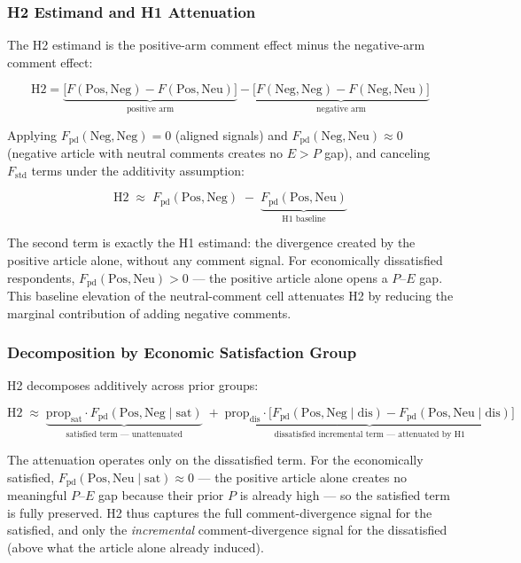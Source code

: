 \documentclass[
  12pt]{article}
\begin{document}
\subsubsection{H2 Estimand and H1
Attenuation}\label{h2-estimand-and-h1-attenuation}

The H2 estimand is the positive-arm comment effect minus the
negative-arm comment effect:

\[\text{H2} = \underbrace{\bigl[F(\text{Pos},\text{Neg}) - F(\text{Pos},\text{Neu})\bigr]}_{\text{positive arm}} - \underbrace{\bigl[F(\text{Neg},\text{Neg}) - F(\text{Neg},\text{Neu})\bigr]}_{\text{negative arm}}\]

Applying \(F_\text{pd}(\text{Neg},\text{Neg}) = 0\) (aligned signals)
and \(F_\text{pd}(\text{Neg},\text{Neu}) \approx 0\) (negative article
with neutral comments creates no \(E > P\) gap), and canceling
\(F_\text{std}\) terms under the additivity assumption:

\[\text{H2} \;\approx\; F_\text{pd}(\text{Pos},\text{Neg}) \;-\; \underbrace{F_\text{pd}(\text{Pos},\text{Neu})}_{\text{H1 baseline}}\]

The second term is exactly the H1 estimand: the divergence created by
the positive article alone, without any comment signal. For economically
dissatisfied respondents, \(F_\text{pd}(\text{Pos},\text{Neu}) > 0\) ---
the positive article alone opens a \(P\)--\(E\) gap. This baseline
elevation of the neutral-comment cell attenuates H2 by reducing the
marginal contribution of adding negative comments.

\subsubsection{Decomposition by Economic Satisfaction
Group}\label{decomposition-by-economic-satisfaction-group}

H2 decomposes additively across prior groups:

\[\text{H2} \;\approx\; \underbrace{\text{prop}_\text{sat} \cdot F_\text{pd}(\text{Pos},\text{Neg} \mid \text{sat})}_{\text{satisfied term — unattenuated}} \;+\; \underbrace{\text{prop}_\text{dis} \cdot \bigl[F_\text{pd}(\text{Pos},\text{Neg} \mid \text{dis}) - F_\text{pd}(\text{Pos},\text{Neu} \mid \text{dis})\bigr]}_{\text{dissatisfied incremental term — attenuated by H1}}\]

The attenuation operates only on the dissatisfied term. For the
economically satisfied,
\(F_\text{pd}(\text{Pos},\text{Neu} \mid \text{sat}) \approx 0\) --- the
positive article alone creates no meaningful \(P\)--\(E\) gap because
their prior \(P\) is already high --- so the satisfied term is fully
preserved. H2 thus captures the full comment-divergence signal for the
satisfied, and only the \emph{incremental} comment-divergence signal for
the dissatisfied (above what the article alone already induced).
\end{document}
